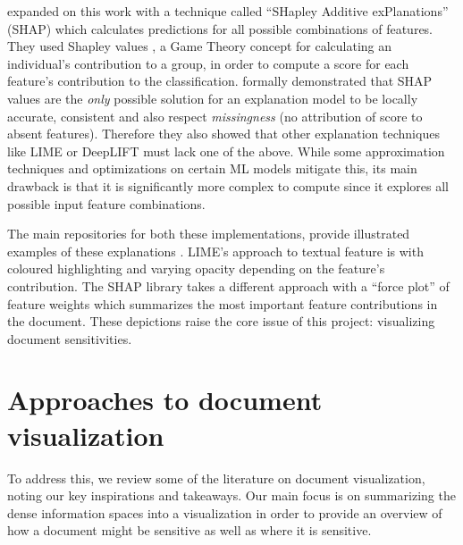 \documentclass[\version]{l4proj}
\begin{document}
\textcite{lundbergUnifiedApproachInterpreting2017} expanded on this work with a technique called ``SHapley Additive exPlanations'' (SHAP) which calculates predictions for all possible combinations of features.
They used Shapley values \autocite{shapleyNotesNPersonGame1951}, a Game Theory concept for calculating an individual's contribution to a group, in order to compute a score for each feature's contribution to the classification.
\textcite{lundbergUnifiedApproachInterpreting2017} formally demonstrated that SHAP values are the \textit{only} possible solution for an explanation model to be locally accurate, consistent and also respect \textit{missingness} (no attribution of score to absent features).
Therefore they also showed that other explanation techniques like LIME or DeepLIFT must lack one of the above.
While some approximation techniques and optimizations on certain ML models mitigate this, its main drawback is that it is significantly more complex to compute since it explores all possible input feature combinations.

The main repositories for both these implementations, provide illustrated examples of these explanations \autocite{lundbergSlundbergShap2020,ribeiroMarcotcrLime2020}.
LIME's approach to textual feature is with coloured highlighting and varying opacity depending on the feature's contribution.
The SHAP library takes a different approach with a ``force plot'' of feature weights which summarizes the most important feature contributions in the document.
These depictions raise the core issue of this project: visualizing document sensitivities.

\section{Approaches to document visualization}

To address this, we review some of the literature on document visualization, noting our key inspirations and takeaways.
Our main focus is on summarizing the dense information spaces into a visualization in order to provide an overview of how a document might be sensitive as well as where it is sensitive.
\end{document}
